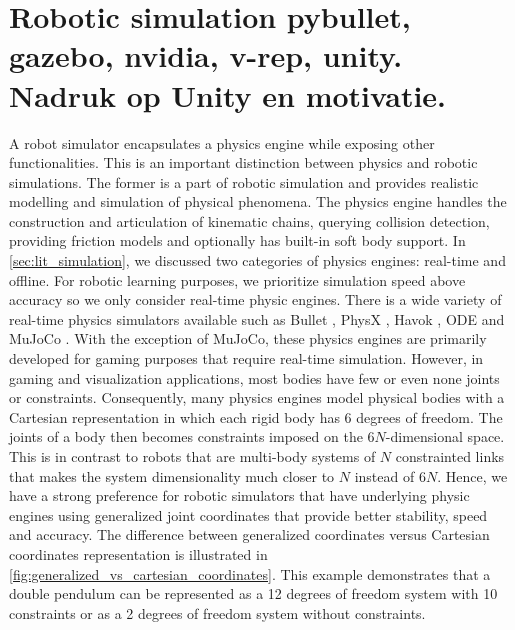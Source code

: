 \documentclass[\home/main.tex]{subfiles}
\begin{document}
\section{Robotic simulation {\tiny pybullet, gazebo, nvidia, v-rep, unity. Nadruk op Unity en motivatie.}}

A robot simulator encapsulates a physics engine while exposing other functionalities. This is an important distinction between physics and robotic simulations. The former is a part of robotic simulation and provides realistic modelling and simulation of physical phenomena. The physics engine handles the construction and articulation of kinematic chains, querying collision detection, providing friction models and optionally has built-in soft body support. 
In \cref{sec:lit_simulation}, we discussed two categories of physics engines: real-time and offline. For robotic learning purposes, we prioritize simulation speed above accuracy so we only consider real-time physic engines. There is a wide variety of real-time physics simulators available such as Bullet \autocite{Bullet}, PhysX \autocite{PhysX}, Havok \autocite{Havok}, ODE \autocite{ODE} and MuJoCo \autocite{Mujoco}. 
With the exception of MuJoCo, these physics engines are primarily developed for gaming purposes that require real-time simulation. However, in gaming and visualization applications, most bodies have few or even none joints or constraints. Consequently, many physics engines model physical bodies with a Cartesian representation in which each rigid body has 6 degrees of freedom. The joints of a body then becomes constraints imposed on the $6N$-dimensional space. This is in contrast to robots that are multi-body systems of $N$ constrainted links that makes the system dimensionality much closer to $N$ instead of $6N$. Hence, we have a strong preference for robotic simulators that have underlying physic engines using generalized joint coordinates that provide better stability, speed and accuracy. The difference between generalized coordinates versus Cartesian coordinates representation is illustrated in \cref{fig:generalized_vs_cartesian_coordinates}. This example demonstrates that a double pendulum can be represented as a 12 degrees of freedom system with 10 constraints or as a 2 degrees of freedom system without constraints. 
\end{document}
